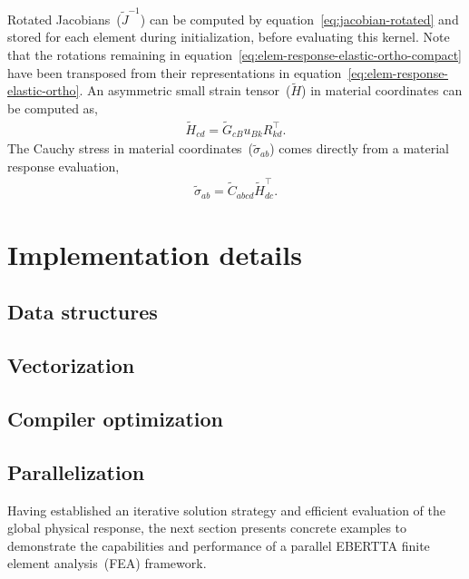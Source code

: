 \documentclass[]             %
{NASA}                       %
\begin{document}
Rotated Jacobians~($\widetilde{J}^{-1}$)
 can be computed by equation~\ref{eq:jacobian-rotated} and stored for each element during initialization, before
 evaluating this kernel.
 Note that the rotations remaining in equation~\ref{eq:elem-response-elastic-ortho-compact} have been transposed from their representations in equation~\ref{eq:elem-response-elastic-ortho}.
 An asymmetric small strain tensor~($\widetilde{H}$) in material coordinates can be computed as,
\begin{eqnarray}
\widetilde{H}_{cd} = \widetilde{G}_{cB} u_{Bk} R_{kd}^{\top}\text{.}
\end{eqnarray}
The Cauchy stress in material coordinates~($\widetilde{\sigma}_{ab}$) 
 comes directly from a material response evaluation,
\begin{eqnarray}
\widetilde{\sigma}_{ab} = \widetilde{C}_{abcd} \widetilde{H}^{\top}_{dc}\text{.}
\end{eqnarray}


\section{Implementation details}
\label{sec:Implementation}

\subsection{Data structures}
\label{subsec:data-structures}


\subsection{Vectorization}
\label{subsec:vectorization}

\subsection{Compiler optimization}
\label{subsec:compiler-optimization}

\subsection{Parallelization}
\label{subsec:parallelization}

Having established an iterative solution strategy and efficient evaluation of the global physical response, the next section presents concrete examples to demonstrate the capabilities and performance of a parallel EBERTTA finite element analysis~(FEA) framework.
\end{document}

